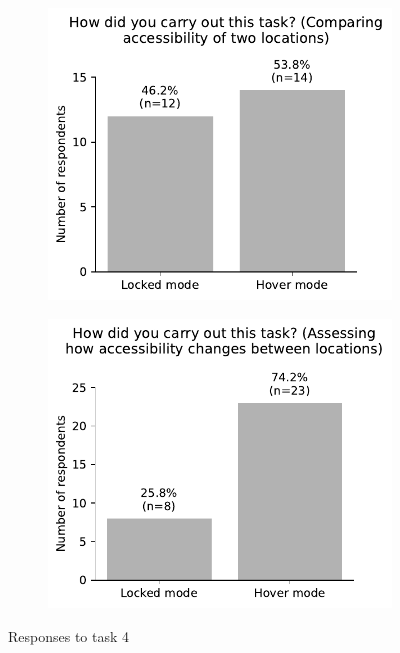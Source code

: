 \begin{appendices}
\begin{figure}[H]
	\begin{subfigure}[b]{0.5\textwidth}
		\includegraphics[width=\textwidth]{visual/figures/survey/5.pdf}
	\end{subfigure}%
	\begin{subfigure}[b]{0.5\textwidth}
		\includegraphics[width=\textwidth]{visual/figures/survey/6.pdf}
	\end{subfigure}
	\newline
	Responses to task 4
\end{figure}


\end{appendices}
